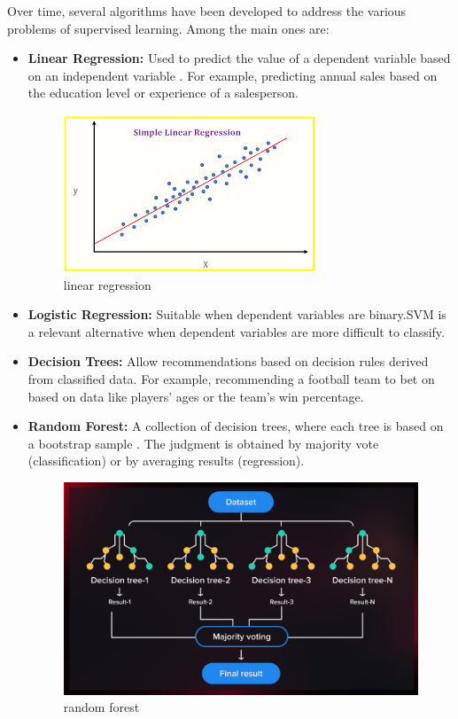 Over time, several algorithms have been developed to address the various problems of supervised learning. Among the main ones are:

\begin{itemize}
	\item \textbf{Linear Regression:} Used to predict the value of a dependent variable based on an independent variable . For example, predicting annual sales based on the education level or experience of a salesperson.

\begin{figure}[ht!]
    \centering
    \includegraphics[width=0.5\linewidth]{chap1/images/linear regression.png}
    \caption{linear regression\cite{scikit-learn2023}}
    \label{fig:enter-label}
\end{figure}

 
	\item \textbf{Logistic Regression:} Suitable when dependent variables are binary.{SVM} is a relevant alternative when dependent variables are more difficult to classify.

    
 
	\item \textbf{Decision Trees:} Allow recommendations based on decision rules derived from classified data. For example, recommending a football team to bet on based on data like players' ages or the team's win percentage.






\item \textbf{Random Forest:} A collection of decision trees, where each tree is based on a bootstrap sample \cite{ho1998random}. The judgment is obtained by majority vote (classification) or by averaging results (regression).


 \begin{figure}[ht!]
     \centering
     \includegraphics[width=0.5\linewidth]{chap1/images/randomforest.png}
     \caption{random forest\cite{ho1998random}}
     \label{fig:enter-label}
 \end{figure}


\end{itemize}
